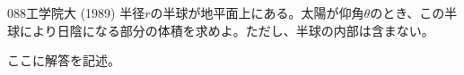 \begin{thm}{088}{}{工学院大 (1989)}
 半径$r$の半球が地平面上にある。太陽が仰角$\theta$のとき、この半球により日陰になる部分の体積を求めよ。ただし、半球の内部は含まない。
\end{thm}

ここに解答を記述。